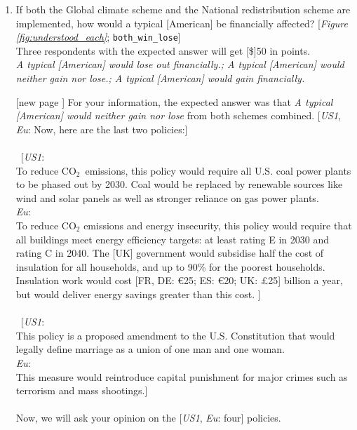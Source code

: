 \begin{enumerate}[resume]
\item  \label{q:understood_both} If both the Global climate scheme and the National redistribution scheme are implemented, how would a typical [American] be financially affected? [\textit{Figure \ref{fig:understood_each}}; \verb|both_win_lose|] \\
Three respondents with the expected answer will get [\$]50 in points.
\\ \textit{A typical [American] would lose out financially.; A typical [American] would neither gain nor lose.; A typical [American] would gain financially.}
\item[[new page\!\!\!]] For your information, the expected answer was that \textit{A typical [American] would neither gain nor lose} from both schemes combined. [\textit{US1}, \textit{Eu}: Now, here are the last two policies:]~ \\
\\
~[\textit{US1}: \textbf{} \\To reduce CO$_\text{2}$~emissions, this policy would require all U.S. coal power plants to be phased out by 2030. Coal would be replaced by renewable sources like wind and solar panels as well as stronger reliance on gas power plants.\\
\textit{Eu}: \textbf{}\\ To reduce CO$_\text{2}$ emissions and energy insecurity, this policy would require that all buildings meet energy efficiency targets: at least rating E in 2030 and rating C in 2040. 
The [UK] government would subsidise half the cost of insulation for all households, and up to 90\% for the poorest households. Insulation work would cost [FR, DE: \euro{}25; ES: \euro{}20; UK: £25] billion a year, but would deliver energy savings greater than this cost.
]~\\
\\
~[\textit{US1}: \textbf{}\\
This policy is a proposed amendment to the U.S. Constitution that would legally define marriage as a union of one man and one woman. \\
\textit{Eu}: \textbf{} \\This measure would reintroduce capital punishment for major crimes such as terrorism and mass shootings.]~\\
\\
Now, we will ask your opinion on the [\textit{US1}, \textit{Eu}: four] policies.\\

\end{enumerate}
